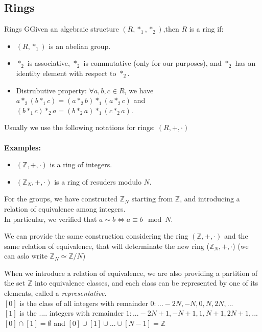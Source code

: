 \newpage

\subsection{Rings}

\begin{defBox}{Rings}
    GGiven an algebraic structure $(R, *_1, *_2)$,then $R$ is a ring if:

    \begin{itemize}
        \item $(R, *_1)$ is an abelian group.
        \item $*_2$ is associative, $*_2$ is commutative (only for our purposes), and $*_2$ has an identity element with respect to $*_2$.
        \item Distrubutive property: $\forall a, b, c \in R$, we have $a *_2 (b *_1 c) = (a *_2 b) *_1 (a *_2 c)$ and $(b *_1 c) *_2 a = (b *_2 a) *_1 (c *_2 a)$.
    \end{itemize}
\end{defBox}

\noindent
Usually we use the following notations for rings: $(R, +, \cdot)$\\
\\
\textbf{Examples:}
\begin{itemize}
    \item $(\mathbb{Z}, +, \cdot)$ is a ring of integers.
    \item $(\mathbb{Z}_N, +, \cdot)$ is a ring of resuders modulo $N$.
\end{itemize}
\medskip

\noindent
For the groups, we have constructed $\mathbb{Z}_N$ starting from $\mathbb{Z}$, and introducing a relation of equivalence among integers.\\
In particular, we verified that $a \sim b \iff a \equiv b \mod N$.
\medskip

\noindent
We can provide the same construction considering the ring $(\mathbb{Z}, +, \cdot)$ and the same relation of equivalence, that will determinate the new ring ($\mathbb{Z}_N, +, \cdot$) (we can aslo write $\mathbb{Z}_N \simeq \mathbb{Z} / N$)
\medskip

\noindent
When we introduce a relation of equivalence, we are also providing a partition of the set $\mathbb{Z}$ into equivalence classes, and each class can be represented by one of its elements, called a \textit{representative}.\\
$[0]$ is the class of all integers with remainder $0:...-2N, -N, 0, N, 2N, ...$\\
$[1]$ is the .... integers with remainder $1:...-2N+1, -N+1, 1, N+1, 2N+1, ...$\\
$[0] \cap [1] = \emptyset$ and $[0] \cup [1] \cup ... \cup [N-1] = \mathbb{Z}$\\
\bigskip

